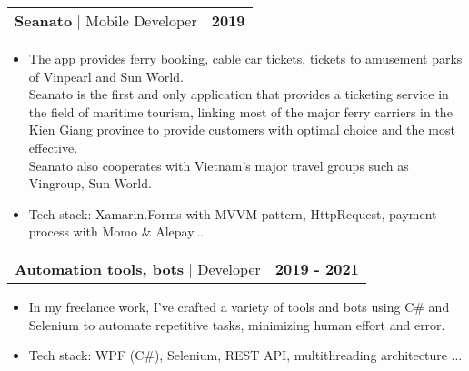 \documentclass[letterpaper,11pt]{article}
\makeatletter
\newcommand{\resumeItem}[1]{
	\item\small{
		{#1 \vspace{-2pt}}
	}
}
\newcommand{\resumeProjectHeading}[2]{
	\item
	\begin{tabular*}{1.001\textwidth}{l@{\extracolsep{\fill}}r}
		\small#1 & \textbf{\small #2}\\
	\end{tabular*}\vspace{-7pt}
}
\newcommand{\resumeItemListStart}{\begin{itemize}}
\newcommand{\resumeItemListEnd}{\end{itemize}\vspace{-5pt}}
\makeatother
\begin{document}


\resumeProjectHeading
{\textbf{\large{Seanato}} $|$ \large{Mobile Developer}}{2019}
\resumeItemListStart
\resumeItem{\normalsize{The app provides ferry booking, cable car tickets, tickets
		to amusement parks of Vinpearl and Sun World.
		\\Seanato is the first and only application that provides a
		ticketing service in the field of maritime tourism, linking
		most of the major ferry carriers in the Kien Giang province
		to provide customers with optimal choice and the most
		effective.
		\\Seanato also cooperates with Vietnam's major travel groups such as Vingroup, Sun World.}}
\resumeItem{\normalsize{Tech stack: Xamarin.Forms with MVVM pattern, HttpRequest, payment
		process with Momo \& Alepay...}}
\resumeItemListEnd
\vspace{-13pt}

\resumeProjectHeading
{\textbf{\large{Automation tools, bots}} $|$ \large{Developer}}{2019 - 2021}
\resumeItemListStart
\resumeItem{\normalsize{In my freelance work, I've crafted a variety of tools
and bots using C\# and Selenium to automate repetitive tasks, minimizing human
effort and error.}}
\resumeItem{\normalsize{Tech stack: WPF (C\#), Selenium, REST API, multithreading architecture ...}}
\resumeItemListEnd
\vspace{-13pt}
\end{document}
